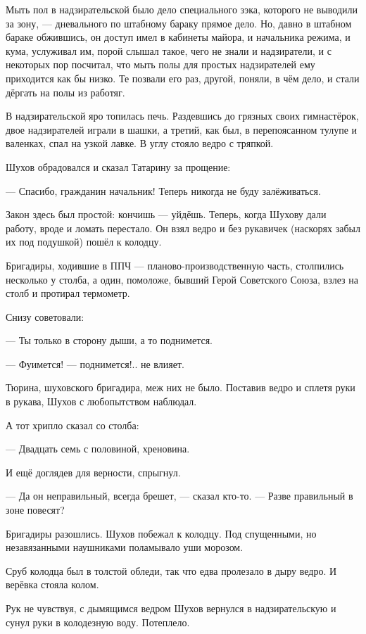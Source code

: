 Мыть пол в надзирательской было дело специального зэка, которого не выводили за зону, --- дневального по штабному бараку прямое дело. Но, давно в штабном бараке обжившись, он доступ имел в кабинеты майора, и начальника режима, и кума, услуживал им, порой слышал такое, чего не знали и надзиратели, и с некоторых пор посчитал, что мыть полы для простых надзирателей ему приходится как бы низко. Те позвали его раз, другой, поняли, в чём дело, и стали дёргать на полы из работяг.

В надзирательской яро топилась печь. Раздевшись до грязных своих гимнастёрок, двое надзирателей играли в шашки, а третий, как был, в перепоясанном тулупе и валенках, спал на узкой лавке. В углу стояло ведро с тряпкой.

Шухов обрадовался и сказал Татарину за прощение:

--- Спасибо, гражданин начальник! Теперь никогда не буду залёживаться.

Закон здесь был простой: кончишь --- уйдёшь. Теперь, когда Шухову дали работу, вроде и ломать перестало. Он взял ведро и без рукавичек (наскорях забыл их под подушкой) пошёл к колодцу.

Бригадиры, ходившие в ППЧ --- планово-производственную часть, столпились несколько у столба, а один, помоложе, бывший Герой Советского Союза, взлез на столб и протирал термометр.

Снизу советовали:

--- Ты только в сторону дыши, а то поднимется.

--- Фуимется! --- поднимется!.. не влияет.

Тюрина, шуховского бригадира, меж них не было. Поставив ведро и сплетя руки в рукава, Шухов с любопытством наблюдал.

А тот хрипло сказал со столба:

--- Двадцать семь с половиной, хреновина.

И ещё доглядев для верности, спрыгнул.

--- Да он неправильный, всегда брешет, --- сказал кто-то. --- Разве правильный в зоне повесят?

Бригадиры разошлись. Шухов побежал к колодцу. Под спущенными, но незавязанными наушниками поламывало уши морозом.

Сруб колодца был в толстой обледи, так что едва пролезало в дыру ведро. И верёвка стояла колом.

Рук не чувствуя, с дымящимся ведром Шухов вернулся в надзирательскую и сунул руки в колодезную воду. Потеплело.

